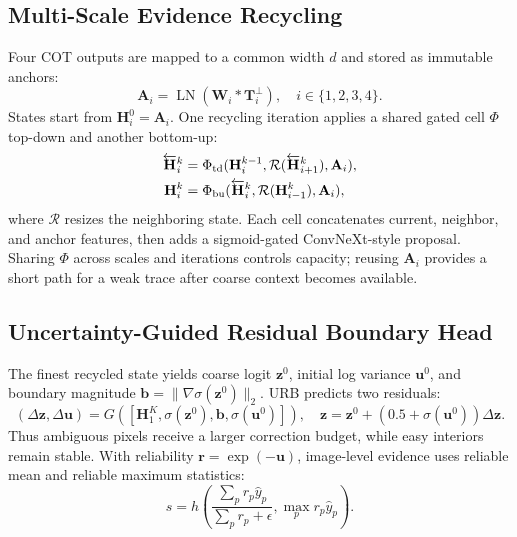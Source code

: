 \documentclass[journal]{IEEEtran}
\begin{document}
\subsection{Multi-Scale Evidence Recycling}
Four COT outputs are mapped to a common width $d$ and stored as immutable anchors:
\begin{equation}
\mathbf A_i=\operatorname{LN}\!\left(\mathbf W_i*\mathbf T_i^{\perp}\right),
\quad i\in\{1,2,3,4\}.
\label{eq:anchors}
\end{equation}
States start from $\mathbf H_i^0=\mathbf A_i$.  One recycling iteration applies a
shared gated cell $\Phi$ top-down and another bottom-up:
\begin{equation}
\begin{split}
\overleftarrow{\mathbf H}_i^k&=\Phi_{\rm td}(\mathbf H_i^{k-1},
\mathcal R(\overleftarrow{\mathbf H}_{i+1}^k),\mathbf A_i),\\
\mathbf H_i^k&=\Phi_{\rm bu}(\overleftarrow{\mathbf H}_i^k,
\mathcal R(\mathbf H_{i-1}^k),\mathbf A_i),
\end{split}
\label{eq:recycle}
\end{equation}
where $\mathcal R$ resizes the neighboring state.  Each cell concatenates current,
neighbor, and anchor features, then adds a sigmoid-gated ConvNeXt-style proposal.
Sharing $\Phi$ across scales and iterations controls capacity; reusing $\mathbf A_i$
provides a short path for a weak trace after coarse context becomes available.

\subsection{Uncertainty-Guided Residual Boundary Head}
The finest recycled state yields coarse logit $\mathbf z^0$, initial log variance
$\mathbf u^0$, and boundary magnitude $\mathbf b=\|\nabla\sigma(\mathbf z^0)\|_2$.
URB predicts two residuals:
\begin{equation}
(\Delta\mathbf z,\Delta\mathbf u)=G([\mathbf H_1^K,
\sigma(\mathbf z^0),\mathbf b,\sigma(\mathbf u^0)]),\quad
\mathbf z=\mathbf z^0+(0.5+\sigma(\mathbf u^0))\Delta\mathbf z.
\label{eq:urb}
\end{equation}
Thus ambiguous pixels receive a larger correction budget, while easy interiors
remain stable.  With reliability $\mathbf r=\exp(-\mathbf u)$, image-level evidence
uses reliable mean and reliable maximum statistics:
\begin{equation}
s=h\!\left(\frac{\sum_p r_p\hat y_p}{\sum_p r_p+\epsilon},
\max_p r_p\hat y_p\right).
\label{eq:image}
\end{equation}
\end{document}
